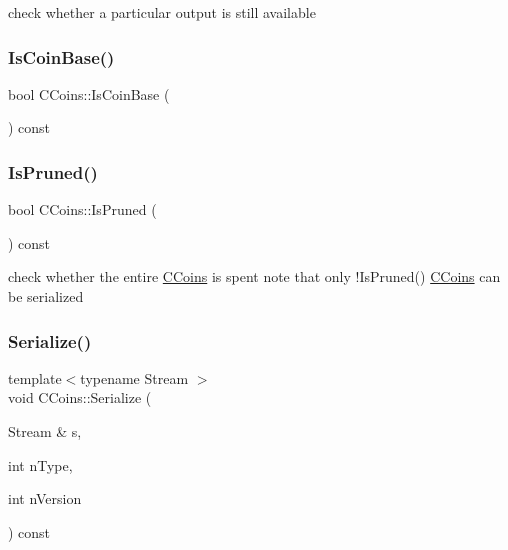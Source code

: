check whether a particular output is still available 

\mbox{\label{class_c_coins_a976c1374c3398e1ee23b1110f1663895}} 
\subsubsection{\texorpdfstring{Is\+Coin\+Base()}{IsCoinBase()}}
{\footnotesize\ttfamily bool C\+Coins\+::\+Is\+Coin\+Base (\begin{DoxyParamCaption}{ }\end{DoxyParamCaption}) const\hspace{0.3cm}{\ttfamily [inline]}}

\mbox{\label{class_c_coins_a597a7cb8830fc29565918ce1823b2244}} 
\subsubsection{\texorpdfstring{Is\+Pruned()}{IsPruned()}}
{\footnotesize\ttfamily bool C\+Coins\+::\+Is\+Pruned (\begin{DoxyParamCaption}{ }\end{DoxyParamCaption}) const\hspace{0.3cm}{\ttfamily [inline]}}

check whether the entire \mbox{\hyperlink{class_c_coins}{C\+Coins}} is spent note that only !\+Is\+Pruned() \mbox{\hyperlink{class_c_coins}{C\+Coins}} can be serialized \mbox{\label{class_c_coins_a7adea91f27b75755e8cfbc7c46fe3848}} 
\subsubsection{\texorpdfstring{Serialize()}{Serialize()}}
{\footnotesize\ttfamily template$<$typename Stream $>$ \\
void C\+Coins\+::\+Serialize (\begin{DoxyParamCaption}\item[{Stream \&}]{s,  }\item[{int}]{n\+Type,  }\item[{int}]{n\+Version }\end{DoxyParamCaption}) const\hspace{0.3cm}{\ttfamily [inline]}}

